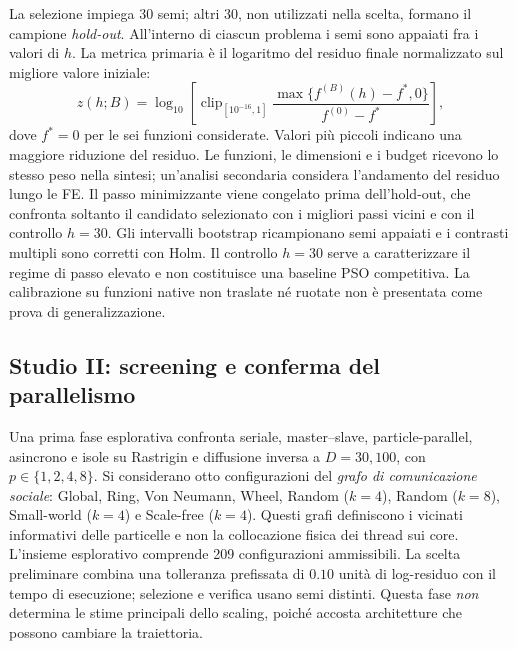 La selezione impiega 30 semi; altri 30, non utilizzati nella scelta, formano il campione \emph{hold-out}. All'interno di ciascun problema i semi sono appaiati fra i valori di $h$. La metrica primaria è il logaritmo del residuo finale normalizzato sul migliore valore iniziale:
\begin{equation}
 z(h;B)=\log_{10}\!\left[\operatorname{clip}_{[10^{-16},1]}
 \frac{\max\{f^{(B)}(h)-f^*,0\}}{f^{(0)}-f^*}\right],
 \label{eq:dt-criterion}
\end{equation}
dove $f^*=0$ per le sei funzioni considerate. Valori più piccoli indicano una maggiore riduzione del residuo. Le funzioni, le dimensioni e i budget ricevono lo stesso peso nella sintesi; un'analisi secondaria considera l'andamento del residuo lungo le FE. Il passo minimizzante viene congelato prima dell'hold-out, che confronta soltanto il candidato selezionato con i migliori passi vicini e con il controllo $h=30$. Gli intervalli bootstrap ricampionano semi appaiati e i contrasti multipli sono corretti con Holm. Il controllo $h=30$ serve a caratterizzare il regime di passo elevato e non costituisce una baseline PSO competitiva. La calibrazione su funzioni native non traslate né ruotate non è presentata come prova di generalizzazione.

\subsection{Studio II: screening e conferma del parallelismo}\label{subsec:exp-parallel}
Una prima fase esplorativa confronta seriale, master--slave, particle-parallel, asincrono e isole su Rastrigin e diffusione inversa a $D=30,100$, con $p\in\{1,2,4,8\}$. Si considerano otto configurazioni del \emph{grafo di comunicazione sociale}: Global, Ring, Von Neumann, Wheel, Random ($k=4$), Random ($k=8$), Small-world ($k=4$) e Scale-free ($k=4$). Questi grafi definiscono i vicinati informativi delle particelle e non la collocazione fisica dei thread sui core. L'insieme esplorativo comprende 209 configurazioni ammissibili. La scelta preliminare combina una tolleranza prefissata di $0.10$ unità di log-residuo con il tempo di esecuzione; selezione e verifica usano semi distinti. Questa fase \emph{non} determina le stime principali dello scaling, poiché accosta architetture che possono cambiare la traiettoria.

